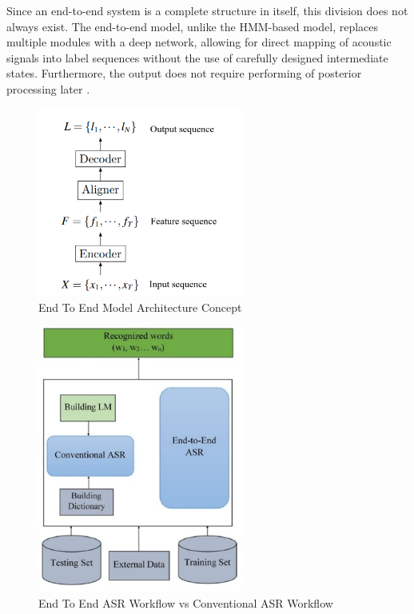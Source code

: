 Since an end-to-end system is a complete structure in itself, this division does not always exist. The end-to-end model, unlike the HMM-based model, replaces multiple modules with a deep network, allowing for direct mapping of acoustic signals into label sequences without the use of carefully designed intermediate states. Furthermore, the output does not require performing of posterior processing later \cite{backstrom_introduction_2022}. 

\begin{figure}[h!]
    \centering
    \includegraphics[width=0.6\textwidth]{img/E2E.png}
    \caption{End To End Model Architecture Concept}
    \label{fig:E2E-mathematical}
\end{figure}

\begin{figure}[h!]
    \centering
    \includegraphics[width=0.6\textwidth]{img/E2EvsConventional.jpg}
    \caption{End To End ASR Workflow vs Conventional ASR Workflow}
    \label{fig:E2E-arch-vs-conventional}
\end{figure}

